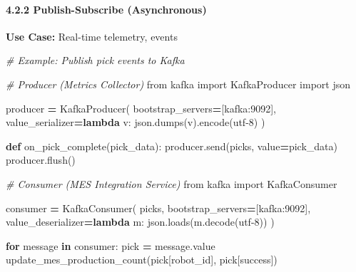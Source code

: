 \documentclass[
]{article}
\newenvironment{Shaded}{\begin{snugshade}}{\end{snugshade}}
\newcommand{\CommentTok}[1]{\textcolor[rgb]{0.56,0.35,0.01}{\textit{#1}}}
\newcommand{\ControlFlowTok}[1]{\textcolor[rgb]{0.13,0.29,0.53}{\textbf{#1}}}
\newcommand{\ImportTok}[1]{#1}
\newcommand{\KeywordTok}[1]{\textcolor[rgb]{0.13,0.29,0.53}{\textbf{#1}}}
\newcommand{\NormalTok}[1]{#1}
\newcommand{\OperatorTok}[1]{\textcolor[rgb]{0.81,0.36,0.00}{\textbf{#1}}}
\newcommand{\StringTok}[1]{\textcolor[rgb]{0.31,0.60,0.02}{#1}}
\begin{document}
\hypertarget{publish-subscribe-asynchronous}{%
\paragraph{4.2.2 Publish-Subscribe
(Asynchronous)}\label{publish-subscribe-asynchronous}}

\textbf{Use Case:} Real-time telemetry, events

\begin{Shaded}
\begin{Highlighting}[]
\CommentTok{\# Example: Publish pick events to Kafka}

\CommentTok{\# Producer (Metrics Collector)}
\ImportTok{from}\NormalTok{ kafka }\ImportTok{import}\NormalTok{ KafkaProducer}
\ImportTok{import}\NormalTok{ json}

\NormalTok{producer }\OperatorTok{=}\NormalTok{ KafkaProducer(}
\NormalTok{    bootstrap\_servers}\OperatorTok{=}\NormalTok{[}\StringTok{\textquotesingle{}kafka:9092\textquotesingle{}}\NormalTok{],}
\NormalTok{    value\_serializer}\OperatorTok{=}\KeywordTok{lambda}\NormalTok{ v: json.dumps(v).encode(}\StringTok{\textquotesingle{}utf{-}8\textquotesingle{}}\NormalTok{)}
\NormalTok{)}

\KeywordTok{def}\NormalTok{ on\_pick\_complete(pick\_data):}
\NormalTok{    producer.send(}\StringTok{\textquotesingle{}picks\textquotesingle{}}\NormalTok{, value}\OperatorTok{=}\NormalTok{pick\_data)}
\NormalTok{    producer.flush()}

\CommentTok{\# Consumer (MES Integration Service)}
\ImportTok{from}\NormalTok{ kafka }\ImportTok{import}\NormalTok{ KafkaConsumer}

\NormalTok{consumer }\OperatorTok{=}\NormalTok{ KafkaConsumer(}
    \StringTok{\textquotesingle{}picks\textquotesingle{}}\NormalTok{,}
\NormalTok{    bootstrap\_servers}\OperatorTok{=}\NormalTok{[}\StringTok{\textquotesingle{}kafka:9092\textquotesingle{}}\NormalTok{],}
\NormalTok{    value\_deserializer}\OperatorTok{=}\KeywordTok{lambda}\NormalTok{ m: json.loads(m.decode(}\StringTok{\textquotesingle{}utf{-}8\textquotesingle{}}\NormalTok{))}
\NormalTok{)}

\ControlFlowTok{for}\NormalTok{ message }\KeywordTok{in}\NormalTok{ consumer:}
\NormalTok{    pick }\OperatorTok{=}\NormalTok{ message.value}
\NormalTok{    update\_mes\_production\_count(pick[}\StringTok{\textquotesingle{}robot\_id\textquotesingle{}}\NormalTok{], pick[}\StringTok{\textquotesingle{}success\textquotesingle{}}\NormalTok{])}
\end{Highlighting}
\end{Shaded}
\end{document}
